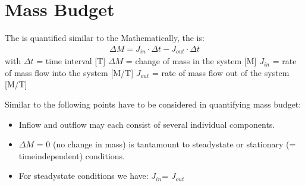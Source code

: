 \documentclass[letterpaper,10pt,english]{jupyterBook}
\begin{document}
\section{Mass Budget}
\label{\detokenize{content/background/03_basic_hydrogeology:mass-budget}}
\sphinxAtStartPar
The  is quantified similar to the  Mathematically, the  is:
\begin{equation*}
\begin{split}\Delta M = J_{in}\cdot \Delta t - J_{out} \cdot \Delta t\end{split}
\end{equation*}
\sphinxAtStartPar
with 
\(\Delta t\) = time interval {[}T{]}
\(\Delta M\) = change of mass in the system {[}M{]}
\(J_{in}\) = rate of mass flow into the system {[}M/T{]}
\(J_{out}\) = rate of mass flow out of the system {[}M/T{]}

\sphinxAtStartPar
Similar to  the following points have to be considered in quantifying mass budget:
\begin{itemize}
\item {} 
\sphinxAtStartPar
Inflow and outflow may each consist of several individual components.

\item {} 
\sphinxAtStartPar
\(\Delta M\) = 0 (no change in mass) is tantamount to steady\sphinxhyphen{}state or stationary (= time\sphinxhyphen{}independent) conditions.

\item {} 
\sphinxAtStartPar
For steady\sphinxhyphen{}state conditions we have: \(J_{in}\)= \(J_{out}\)

\end{itemize}
\end{document}
